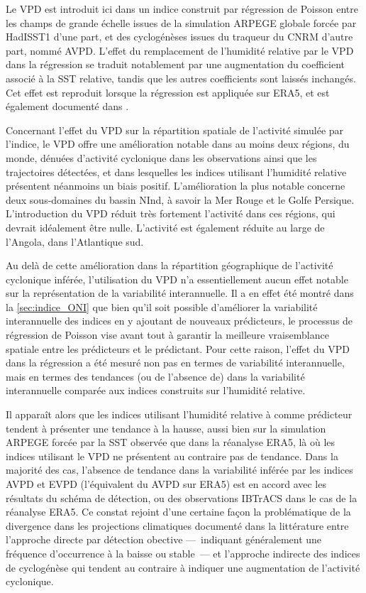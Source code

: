 \documentclass[../main.tex]{subfiles}
\begin{document}
Le VPD est introduit ici dans un indice construit par régression de Poisson entre les champs de grande échelle issues de la simulation ARPEGE globale forcée par
HadISST1 d'une part, et des cyclogénèses issues du traqueur du CNRM d'autre part, nommé AVPD. L'effet du remplacement de l'humidité relative par le VPD dans la
régression se traduit notablement par une augmentation du coefficient associé à la SST relative, tandis que les autres coefficients sont laissés inchangés. Cet
effet est reproduit lorsque la régression est appliquée sur ERA5, et est également documenté dans \textcite{camargo_testing_2014}.

Concernant l'effet du VPD sur la répartition spatiale de l'activité simulée par l'indice, le VPD offre une amélioration notable dans au moins deux régions, du
monde, dénuées d'activité cyclonique dans les observations ainsi que les trajectoires détectées, et dans lesquelles les indices utilisant l'humidité relative
présentent néanmoins un biais positif. L'amélioration la plus notable concerne deux sous-domaines du bassin NInd, à savoir la Mer Rouge et le Golfe Persique.
L'introduction du VPD réduit très fortement l'activité dans ces régions, qui devrait idéalement être nulle. L'activité est également réduite au large de
l'Angola, dans l'Atlantique sud.

Au delà de cette amélioration dans la répartition géographique de l'activité cyclonique inférée, l'utilisation du VPD n'a essentiellement aucun effet notable
sur la représentation de la variabilité interannuelle. Il a en effet été montré dans la \cref{sec:indice_ONI} que bien qu'il soit possible d'améliorer la
variabilité interannuelle des indices en y ajoutant de nouveaux prédicteurs, le processus de régression de Poisson vise avant tout à garantir la meilleure
vraisemblance spatiale entre les prédicteurs et le prédictant. Pour cette raison, l'effet du VPD dans la régression a été mesuré non pas en termes de
variabilité interannuelle, mais en termes des tendances (ou de l'absence de) dans la variabilité interannuelle comparée aux indices construits sur l'humidité
relative.

Il apparaît alors que les indices utilisant l'humidité relative à  comme prédicteur tendent à présenter une tendance à la hausse, aussi bien sur la
simulation ARPEGE forcée par la SST observée que dans la réanalyse ERA5, là où les indices utilisant le VPD ne présentent au contraire pas de tendance. Dans la
majorité des cas, l'absence de tendance dans la variabilité inférée par les indices AVPD et EVPD (l'équivalent du AVPD sur ERA5) est en accord avec les
résultats du schéma de détection, ou des observations IBTrACS dans le cas de la réanalyse ERA5. Ce constat rejoint d'une certaine façon la problématique de la
divergence dans les projections climatiques documenté dans la littérature entre l'approche directe par détection obective ---~indiquant généralement une
fréquence d'occurrence à la baisse ou stable~--- et l'approche indirecte des indices de cyclogénèse qui tendent au contraire à indiquer une augmentation de
l'activité cyclonique.
\end{document}
